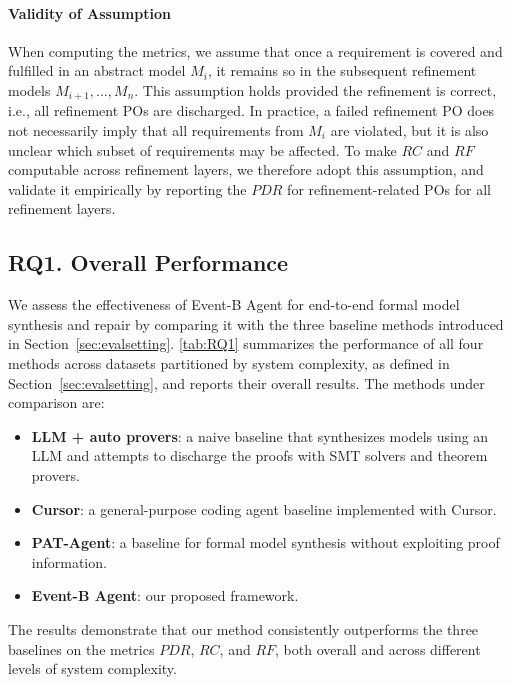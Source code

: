 \paragraph{Validity of Assumption}
When computing the metrics, we assume that once a requirement is covered and fulfilled in an abstract model $M_i$, it remains so in the subsequent refinement models $M_{i+1}, \dots, M_n$.
This assumption holds provided the refinement is correct, i.e., all refinement POs are discharged.
In practice, a failed refinement PO does not necessarily imply that all requirements from $M_i$ are violated, but it is also unclear which subset of requirements may be affected.
To make $RC$ and $RF$ computable across refinement layers, we therefore adopt this assumption, and validate it empirically by reporting the $PDR$ for refinement-related POs for all refinement layers.





\subsection{RQ1. Overall Performance} \label{sec:rq1}
We assess the effectiveness of Event-B Agent for end-to-end formal model synthesis and repair by comparing it with the three baseline methods introduced in Section~\ref{sec:evalsetting}.
\autoref{tab:RQ1} summarizes the performance of all four methods across datasets partitioned by system complexity, as defined in Section~\ref{sec:evalsetting}, and reports their overall results.
The methods under comparison are:
\begin{itemize}
    \item \textbf{LLM + auto provers}: a naive baseline that synthesizes models using an LLM and attempts to discharge the proofs with SMT solvers and theorem provers.
    \item \textbf{Cursor}: a general-purpose coding agent baseline implemented with Cursor.
    \item \textbf{PAT-Agent}: a baseline for formal model synthesis without exploiting proof information.
    \item \textbf{Event-B Agent}: our proposed framework.
\end{itemize}
The results demonstrate that our method consistently outperforms the three baselines on the metrics $PDR$, $RC$, and $RF$, both overall and across different levels of system complexity.




